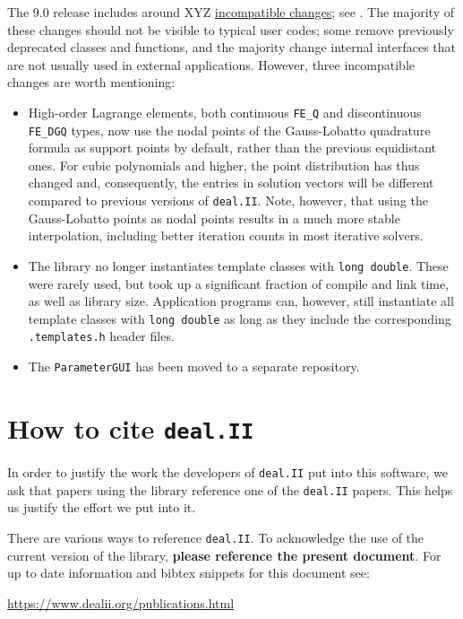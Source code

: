 \documentclass{ansarticle-preprint}
\newcommand{\specialword}[1]{\texttt{#1}}
\newcommand{\dealii}{{\specialword{deal.II}}}
\begin{document}
The 9.0 release includes around XYZ
\href{https://www.dealii.org/developer/doxygen/deal.II/changes_between_8_5_and_9_0.html}{
incompatible changes}; see \cite{changes90}. The majority of these changes
should not be visible to typical user codes; some remove previously
deprecated classes and functions, and the majority change internal
interfaces that are not usually used in external applications. However, three
incompatible changes are worth mentioning:
\begin{itemize}
  \item High-order Lagrange elements, both continuous \verb!FE_Q! and
    discontinuous \verb!FE_DGQ! types, now use the nodal points of the
    Gauss-Lobatto quadrature formula as support points by default, rather than the
    previous equidistant ones. For cubic polynomials and higher, the point
    distribution has thus changed and, consequently, the entries in
    solution vectors will be different compared to previous
    versions of \dealii{}. Note, however, that using the Gauss-Lobatto points as nodal
    points results in a much more stable interpolation, including better
    iteration counts in most iterative solvers.
  \item
    The library no longer instantiates template classes with \texttt{long
    double}. These were rarely used, but took up a significant
    fraction of compile and link time, as well as library
    size. Application programs can, however, still instantiate all
    template classes with \texttt{long
    double} as long as they include the corresponding \texttt{.templates.h}
    header files.
  \item
    The \texttt{ParameterGUI} has been moved to a separate repository.
\end{itemize}



\section{How to cite \dealii{}}\label{sec:cite}

In order to justify the work the developers of \dealii{} put into this
software, we ask that papers using the library reference one of the
\dealii{} papers. This helps us justify the effort we put into it.

There are various ways to reference \dealii{}. To acknowledge the use of the
current version of the library, \textbf{please reference the present document}. For up
to date information and bibtex snippets for this document see:
\begin{center}
 \url{https://www.dealii.org/publications.html}
\end{center}
\end{document}
